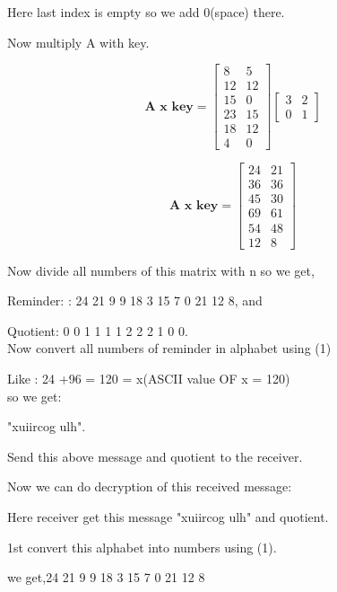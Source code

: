 \documentclass[12pt]{article}
\begin{document}
    Here last index is empty so we add 0(space) there.
    
    Now  multiply A with key.
    
     $$\textbf{A x key} =
     \begin{bmatrix}
         8 & 5\\
        12 & 12\\
        15 & 0\\
        23 & 15\\
        18 & 12\\
        4 & 0
    \end{bmatrix}
    \begin{bmatrix}
         3 & 2\\
        0 & 1
    \end{bmatrix}
    $$
    
    $$\textbf{A x key} =
    \begin{bmatrix}
         24 & 21\\
        36 & 36\\
        45 & 30\\
        69 & 61\\
        54 & 48\\
        12 & 8
    \end{bmatrix}
    $$
    
    
    Now  divide all numbers of this matrix  with n so  we get,
    
    Reminder: : 24 21 9 9 18 3 15 7 0 21 12 8, and
    
    Quotient: 0 0 1 1 1 1 2 2 2 1 0 0.\\
    
   Now convert all numbers of reminder in alphabet using (1) 
   
   Like : 24 +96 = 120 = x(ASCII value OF x = 120)\\
   so we get:
	\begin{center}
        "xuiircog ulh".
    \end{center}
    
    Send this above message and quotient to the receiver.
    
    
    Now we can do decryption of this received message:
    
    Here receiver get this message "xuiircog ulh" and quotient.
    
    1st convert this alphabet into numbers using (1).
    
    we get,24 21 9 9 18 3 15 7 0 21 12 8
    
\end{document}
